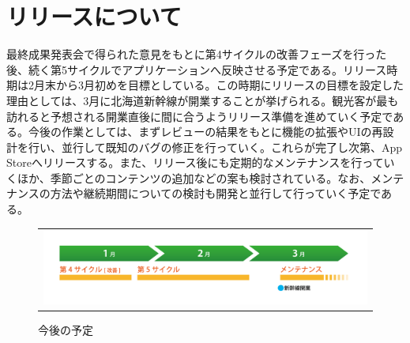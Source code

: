 \section{リリースについて}
最終成果発表会で得られた意見をもとに第4サイクルの改善フェーズを行った後、続く第5サイクルでアプリケーションへ反映させる予定である。リリース時期は2月末から3月初めを目標としている。この時期にリリースの目標を設定した理由としては、3月に北海道新幹線が開業することが挙げられる。観光客が最も訪れると予想される開業直後に間に合うようリリース準備を進めていく予定である。今後の作業としては、まずレビューの結果をもとに機能の拡張やUIの再設計を行い、並行して既知のバグの修正を行っていく。これらが完了し次第、App Storeへリリースする。また、リリース後にも定期的なメンテナンスを行っていくほか、季節ごとのコンテンツの追加などの案も検討されている。なお、メンテナンスの方法や継続期間についての検討も開発と並行して行っていく予定である。
\begin{figure}[htbp]
  \begin{flushleft}
    \begin{tabular}{c}

      \begin{minipage}{0.7\hsize}
        \begin{center}
\includegraphics[width=15cm, bb=0 0 1478 338]{release-1.png}
       
        \end{center}
      \end{minipage}

    \end{tabular}
    \caption{今後の予定}
    \label{fig:lena}
  \end{flushleft}
\end{figure}
